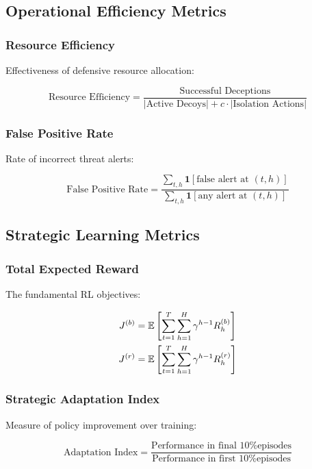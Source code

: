 \documentclass[12pt,twoside]{article}
\begin{document}
\subsection{Operational Efficiency Metrics}

\subsubsection{Resource Efficiency}
Effectiveness of defensive resource allocation:

\begin{equation}
\text{Resource Efficiency} = \frac{\text{Successful Deceptions}}{|\text{Active Decoys}| + c \cdot |\text{Isolation Actions}|}
\end{equation}

\subsubsection{False Positive Rate}
Rate of incorrect threat alerts:

\begin{equation}
\text{False Positive Rate} = \frac{\sum_{t,h} \mathbf{1}[\text{false alert at } (t,h)]}{\sum_{t,h} \mathbf{1}[\text{any alert at } (t,h)]}
\end{equation}

\subsection{Strategic Learning Metrics}

\subsubsection{Total Expected Reward}
The fundamental RL objectives:

\begin{align}
J^{(b)} &= \mathbb{E}\left[\sum_{t=1}^{T} \sum_{h=1}^{H} \gamma^{h-1} R_h^{(b)}\right] \\
J^{(r)} &= \mathbb{E}\left[\sum_{t=1}^{T} \sum_{h=1}^{H} \gamma^{h-1} R_h^{(r)}\right]
\end{align}

\subsubsection{Strategic Adaptation Index}
Measure of policy improvement over training:

\begin{equation}
\text{Adaptation Index} = \frac{\text{Performance in final 10\% episodes}}{\text{Performance in first 10\% episodes}}
\end{equation}
\end{document}
